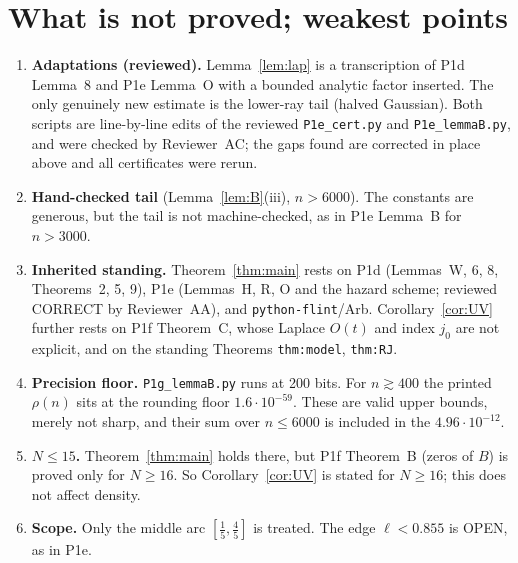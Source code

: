 \documentclass[11pt]{article}
\theoremstyle{definition}\newtheorem{definition}[theorem]{Definition}
\theoremstyle{remark}\newtheorem{remark}[theorem]{Remark}
\begin{document}
\section{What is not proved; weakest points}\label{sec:open}
\begin{enumerate}
\item \textbf{Adaptations (reviewed).} Lemma~\ref{lem:lap} is a transcription of P1d Lemma~8 and P1e Lemma~O with a bounded analytic factor inserted. The only genuinely new estimate is the lower-ray tail (halved Gaussian). Both scripts are line-by-line edits of the reviewed \texttt{P1e\_cert.py} and \texttt{P1e\_lemmaB.py}, and were checked by Reviewer~AC; the gaps found are corrected in place above and all certificates were rerun.
\item \textbf{Hand-checked tail} (Lemma~\ref{lem:B}(iii), $n>6000$). The constants are generous, but the tail is not machine-checked, as in P1e Lemma~B for $n>3000$.
\item \textbf{Inherited standing.} Theorem~\ref{thm:main} rests on P1d (Lemmas~W, 6, 8, Theorems~2, 5, 9), P1e (Lemmas~H, R, O and the hazard scheme; reviewed CORRECT by Reviewer~AA), and \texttt{python-flint}/Arb. Corollary~\ref{cor:UV} further rests on P1f Theorem~C, whose Laplace $O(t)$ and index $j_0$ are not explicit, and on the standing Theorems \texttt{thm:model}, \texttt{thm:RJ}.
\item \textbf{Precision floor.} \texttt{P1g\_lemmaB.py} runs at 200 bits. For $n\gtrsim400$ the printed $\rho(n)$ sits at the rounding floor $1.6\cdot10^{-59}$. These are valid upper bounds, merely not sharp, and their sum over $n\le6000$ is included in the $4.96\cdot10^{-12}$.
\item \textbf{$N\le15$.} Theorem~\ref{thm:main} holds there, but P1f Theorem~B (zeros of $B$) is proved only for $N\ge16$. So Corollary~\ref{cor:UV} is stated for $N\ge16$; this does not affect density.
\item \textbf{Scope.} Only the middle arc $[\frac15,\frac45]$ is treated. The edge $\ell<0.855$ is OPEN, as in P1e.
\end{enumerate}
\end{document}

